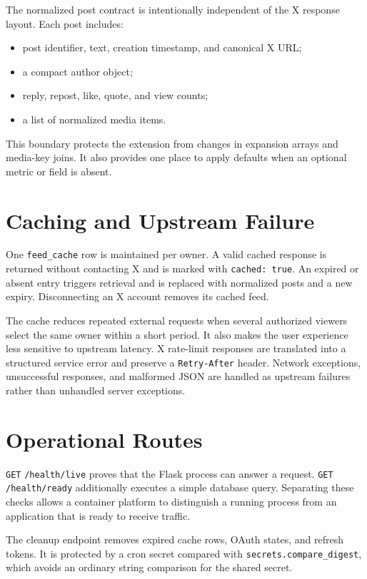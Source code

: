 \documentclass[11pt,a4paper]{report}
\newcommand{\code}[1]{\texttt{#1}}
\newcommand{\api}[2]{\texttt{#1} \texttt{#2}}
\begin{document}
The normalized post contract is intentionally independent of the X response
layout. Each post includes:

\begin{itemize}
  \item post identifier, text, creation timestamp, and canonical X URL;
  \item a compact author object;
  \item reply, repost, like, quote, and view counts;
  \item a list of normalized media items.
\end{itemize}

This boundary protects the extension from changes in expansion arrays and
media-key joins. It also provides one place to apply defaults when an optional
metric or field is absent.

\section{Caching and Upstream Failure}
One \code{feed\_cache} row is maintained per owner. A valid cached response is
returned without contacting X and is marked with \code{cached: true}. An
expired or absent entry triggers retrieval and is replaced with normalized
posts and a new expiry. Disconnecting an X account removes its cached feed.

The cache reduces repeated external requests when several authorized viewers
select the same owner within a short period. It also makes the user experience
less sensitive to upstream latency. X rate-limit responses are translated into
a structured service error and preserve a \code{Retry-After} header. Network
exceptions, unsuccessful responses, and malformed JSON are handled as
upstream failures rather than unhandled server exceptions.

\section{Operational Routes}
\api{GET}{/health/live} proves that the Flask process can answer a request.
\api{GET}{/health/ready} additionally executes a simple database query.
Separating these checks allows a container platform to distinguish a running
process from an application that is ready to receive traffic.

The cleanup endpoint removes expired cache rows, OAuth states, and refresh
tokens. It is protected by a cron secret compared with
\code{secrets.compare\_digest}, which avoids an ordinary string comparison for
the shared secret.
\end{document}
